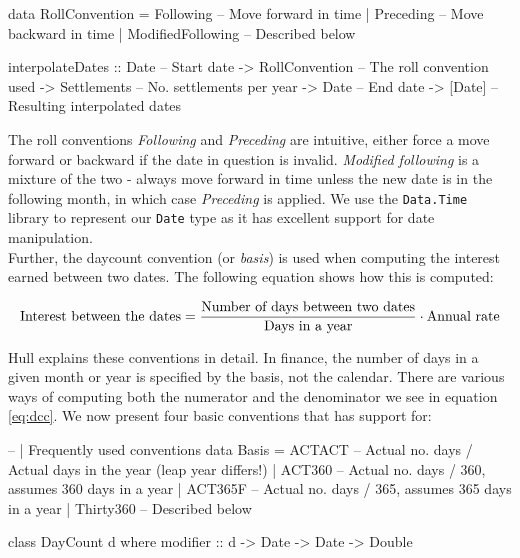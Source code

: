\begin{hscode}
data RollConvention = Following -- Move forward in time 
                    | Preceding -- Move backward in time
                    | ModifiedFollowing -- Described below

interpolateDates :: Date           -- Start date
                 -> RollConvention -- The roll convention used
                 -> Settlements    -- No. settlements per year
                 -> Date           -- End date
                 -> [Date]         -- Resulting interpolated dates
\end{hscode}

The roll conventions \emph{Following} and \emph{Preceding} are intuitive, either
force a move forward or backward if the date in question is invalid. 
\emph{Modified following} is a mixture of the two - always move forward in time
unless the new date is in the following month, in which case \emph{Preceding}
is applied.
We use the \texttt{Data.Time} library to represent our \texttt{Date} type
as it has excellent support for date manipulation.\\

Further, the daycount convention (or \emph{basis}) is used when computing the
interest earned between two dates. The following equation shows how this is
computed:

\begin{equation}\label{eq:dcc}
\text{Interest between the dates} = \\
\frac{\text{Number of days between two dates}}{\text{Days in a year}} \cdot \text{Annual rate}
\end{equation}

Hull\cite{HULL} explains these conventions in detail.
In finance, the number of days in a given month or year is specified by the
basis, not the calendar. There are various ways of computing both the numerator
and the denominator we see in equation \ref{eq:dcc}. We now present four basic
conventions that \hql has support for:

\begin{hscode}
-- | Frequently used conventions 
data Basis = ACTACT -- Actual no. days / Actual days in the year (leap year differs!)
           | ACT360    -- Actual no. days / 360, assumes 360 days in a year
           | ACT365F   -- Actual no. days / 365, assumes 365 days in a year
           | Thirty360 -- Described below

class DayCount d where
  modifier :: d -> Date -> Date -> Double
\end{hscode}

